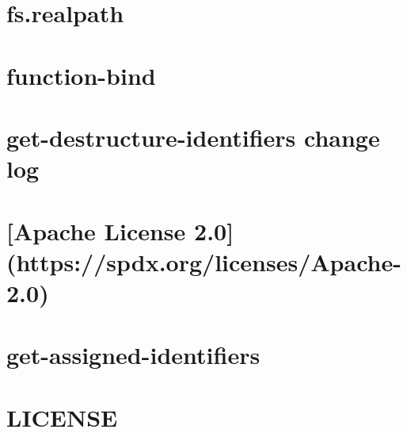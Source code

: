 \documentclass[twoside]{book}
\newcommand{\+}{\discretionary{\mbox{\scriptsize$\hookleftarrow$}}{}{}}
\begin{document}
\chapter{fs.\+realpath}
\label{md_dsmacc_examples_DRmerge_node_modules_fs_8realpath_README}

\chapter{function-\/bind}
\label{md_dsmacc_examples_DRmerge_node_modules_function-bind_README}

\chapter{get-\/destructure-\/identifiers change log}
\label{md_dsmacc_examples_DRmerge_node_modules_get-assigned-identifiers_CHANGELOG}

\chapter{\mbox{[}Apache License 2.0\mbox{]}(https\+://spdx.org/licenses/\+Apache-\/2.0)}
\label{md_dsmacc_examples_DRmerge_node_modules_get-assigned-identifiers_LICENSE}

\chapter{get-\/assigned-\/identifiers}
\label{md_dsmacc_examples_DRmerge_node_modules_get-assigned-identifiers_README}

\chapter{L\+I\+C\+E\+N\+SE}
\label{md_dsmacc_examples_DRmerge_node_modules_get-caller-file_LICENSE}

\end{document}

